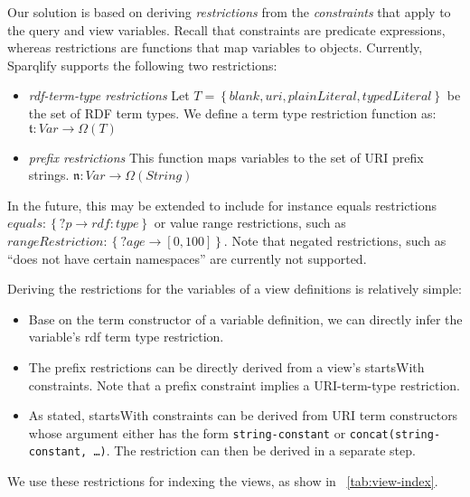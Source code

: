 \documentclass[a4paper,twoside,bibtotoc,abstracton,12pt,BCOR=15mm]{scrreprt}
\begin{document}
Our solution is based on deriving \emph{restrictions} from the \emph{constraints} that apply to the query and view variables.
Recall that constraints are predicate expressions, whereas restrictions are functions that map variables to objects.
Currently, Sparqlify supports the following two restrictions:
\begin{itemize}
  \item \emph{rdf-term-type restrictions} Let $T = \left \{blank, uri, plainLiteral, typedLiteral \right \}$ be the set of RDF term types. We define
  a term type restriction function as: $\mathfrak{t}: Var \rightarrow \Omega \left ( T  \right)$
  \item \emph{prefix restrictions} This function maps variables to the set of URI prefix strings. $\mathfrak{n}: Var \rightarrow \Omega \left( String \right)$
\end{itemize}
In the future, this may be extended to include for instance equals restrictions $equals: \left \{?p \rightarrow rdf:type \right\}$
or value range restrictions, such as $rangeRestriction: \left \{?age \rightarrow [0, 100] \right\}$.
Note that negated restrictions, such as ``does not have certain namespaces'' are currently not supported.


Deriving the restrictions for the variables of a view definitions is relatively simple:
\begin{itemize}
  \item Base on the term constructor of a variable definition, we can directly infer the variable's rdf term type restriction.
  \item The prefix restrictions can be directly derived from a view's startsWith constraints. Note that a prefix constraint implies a URI-term-type restriction. 
  \item As stated, startsWith constraints can be derived from URI term constructors whose argument either has the form \texttt{string-constant} or \texttt{concat(string-constant, \ldots)}.
  The restriction can then be derived in a separate step. 
\end{itemize}
We use these restrictions for indexing the views, as show in ~\autoref{tab:view-index}. 
\end{document}
